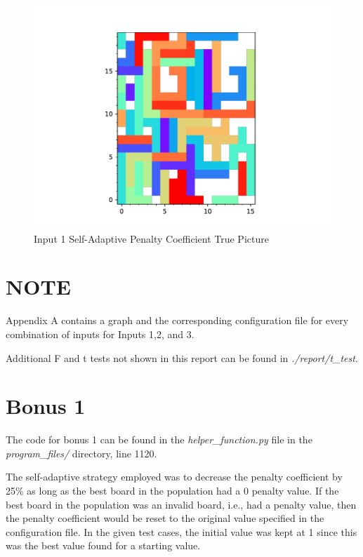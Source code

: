 \documentclass[times]{article}
\begin{document}
	\begin{figure}
		\caption{Input 1 Self-Adaptive Penalty Coefficient True Picture}
		\label{fig:coeff1TruePicture}
		\includegraphics[width=\textwidth]{../graphs/picture/1070}
	\end{figure}


	\section{NOTE}
	Appendix A contains a graph and the corresponding configuration file for every combination of inputs for Inputs 1,2, and 3.

	Additional F and t tests not shown in this report can be found in \textit{./report/t\_test}.


	\section{Bonus 1}
	The code for bonus 1 can be found in the \textit{helper\_function.py} file in the \textit{program\_files/} directory, line 1120.

	The self-adaptive strategy employed was to decrease the penalty coefficient by 25\% as long as the best board in the population had a 0 penalty value. If the best board in the population was an invalid board, i.e., had a penalty value, then the penalty coefficient would be reset to the original value specified in the configuration file. In the given test cases, the initial value was kept at 1 since this was the best value found for a starting value.
\end{document}
